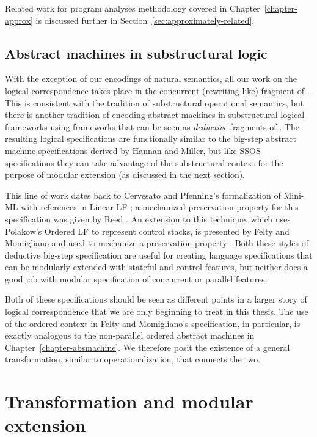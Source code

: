 Related work for program analyses methodology covered in 
Chapter~\ref{chapter-approx} is
discussed further in Section~\ref{sec:approximately-related}.

\subsection*{Abstract machines in substructural logic}

With the exception of our encodings of natural semantics, all our
work on the logical correspondence takes place in the concurrent
(rewriting-like) fragment of \sls. This is consistent with the
tradition of substructural operational semantics, but there is another
tradition of encoding abstract machines in substructural logical
frameworks using frameworks that can be seen as {\it deductive}
fragments of \sls. The resulting logical specifications are
functionally similar to the big-step abstract machine specifications
derived by Hannan and Miller, but like SSOS specifications they can
take advantage of the substructural context for the purpose of modular
extension (as discussed in the next section).

This line of work dates back to Cervesato and Pfenning's formalization
of Mini-ML with references in Linear LF \cite{cervesato02linear}; a
mechanized preservation property for this specification was given by
Reed \cite{reed09hybrid}. An extension to this technique, which uses
Polakow's Ordered LF to represent control stacks, is presented by
Felty and Momigliano and used to mechanize a preservation property
\cite{felty12hybrid}. Both these styles of deductive big-step
specification are useful for creating language specifications that can
be modularly extended with stateful and control features, but neither
does a good job with modular specification of concurrent or parallel
features.

Both of these specifications should be seen as different points in a
larger story of logical correspondence that we are only beginning to
treat in this thesis. The use of the ordered context in Felty and
Momigliano's specification, in particular, is exactly analogous to the
non-parallel ordered abstract machines in
Chapter~\ref{chapter-absmachine}. We therefore posit the existence of
a general transformation, similar to operationalization, that connects
the two.

\section{Transformation and modular extension}
\label{sec:the-point-is-modular-extension}

